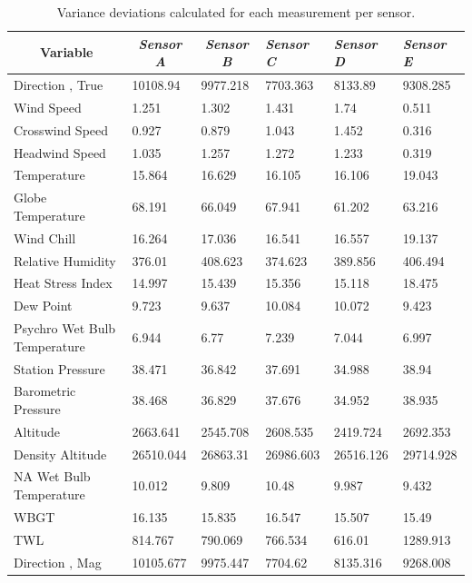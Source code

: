 \documentclass[a4paper,12pt]{article} %
\begin{document}
\begin{enumerate}
\begin{table}[H]

\centering
\caption{Variance deviations calculated for each measurement per sensor.}
\begin{tabular}{llllll}
\multicolumn{1}{c}{\textbf{Variable}} & \multicolumn{1}{c}{\textit{Sensor A}} & \multicolumn{1}{c}{\textit{Sensor B}} & \textit{Sensor C} & \textit{Sensor D} & \textit{Sensor E}  \\ \hline
Direction ‚ True             & 10108.94  & 9977.218  & 7703.363  & 8133.89   & 9308.285  \\
Wind Speed                   & 1.251     & 1.302     & 1.431     & 1.74      & 0.511     \\
Crosswind Speed              & 0.927     & 0.879     & 1.043     & 1.452     & 0.316     \\
Headwind Speed               & 1.035     & 1.257     & 1.272     & 1.233     & 0.319     \\
Temperature                  & 15.864    & 16.629    & 16.105    & 16.106    & 19.043    \\
Globe Temperature            & 68.191    & 66.049    & 67.941    & 61.202    & 63.216    \\
Wind Chill                   & 16.264    & 17.036    & 16.541    & 16.557    & 19.137    \\
Relative Humidity            & 376.01    & 408.623   & 374.623   & 389.856   & 406.494   \\
Heat Stress Index            & 14.997    & 15.439    & 15.356    & 15.118    & 18.475    \\
Dew Point                    & 9.723     & 9.637     & 10.084    & 10.072    & 9.423     \\
Psychro Wet Bulb Temperature & 6.944     & 6.77      & 7.239     & 7.044     & 6.997     \\
Station Pressure             & 38.471    & 36.842    & 37.691    & 34.988    & 38.94     \\
Barometric Pressure          & 38.468    & 36.829    & 37.676    & 34.952    & 38.935    \\
Altitude                     & 2663.641  & 2545.708  & 2608.535  & 2419.724  & 2692.353  \\
Density Altitude             & 26510.044 & 26863.31  & 26986.603 & 26516.126 & 29714.928 \\
NA Wet Bulb Temperature      & 10.012    & 9.809     & 10.48     & 9.987     & 9.432     \\
WBGT                         & 16.135    & 15.835    & 16.547    & 15.507    & 15.49     \\
TWL                          & 814.767   & 790.069   & 766.534   & 616.01    & 1289.913  \\
Direction ‚ Mag              & 10105.677 & 9975.447  & 7704.62   & 8135.316  & 9268.008 
\end{tabular}
\label{var-table}
\end{table}


\end{enumerate}
\end{document}
